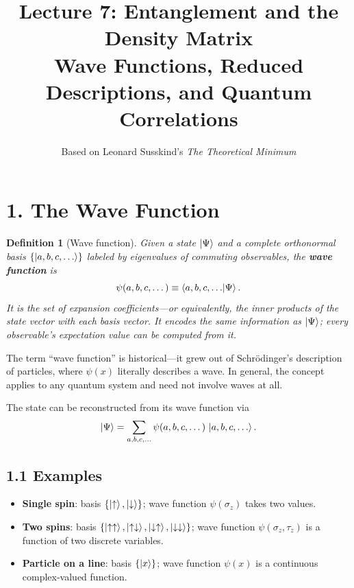 \documentclass[12pt,a4paper]{article}
\title{\textbf{Lecture 7: Entanglement and the Density Matrix} \\ \large Wave Functions, Reduced Descriptions, and Quantum Correlations}
\author{Based on Leonard Susskind's \textit{The Theoretical Minimum}}
\date{}
\newtheorem{definition}{Definition}
\begin{document}
\maketitle
\thispagestyle{fancy}

\section{1. The Wave Function}

\begin{definition}[Wave function]
Given a state $\ket{\Psi}$ and a complete orthonormal basis $\{\ket{a,b,c,\dots}\}$ labeled by eigenvalues of commuting observables, the \textbf{wave function} is
\[
    \psi(a,b,c,\dots) \equiv \braket{a,b,c,\dots}{\Psi}.
\]
It is the set of expansion coefficients---or equivalently, the inner products of the state vector with each basis vector.  It encodes the same information as $\ket{\Psi}$; every observable's expectation value can be computed from it.
\end{definition}

\noindent The term ``wave function'' is historical---it grew out of Schr\"odinger's description of particles, where $\psi(x)$ literally describes a wave.  In general, the concept applies to any quantum system and need not involve waves at all.

The state can be reconstructed from its wave function via
\[
    \ket{\Psi} = \sum_{a,b,c,\dots} \psi(a,b,c,\dots)\,\ket{a,b,c,\dots}.
\]

\subsection{1.1 Examples}
\begin{itemize}[nosep]
    \item \textbf{Single spin}: basis $\{\ket{\uparrow},\ket{\downarrow}\}$; wave function $\psi(\sigma_z)$ takes two values.
    \item \textbf{Two spins}: basis $\{\ket{\uparrow\uparrow},\ket{\uparrow\downarrow},\ket{\downarrow\uparrow},\ket{\downarrow\downarrow}\}$; wave function $\psi(\sigma_z,\tau_z)$ is a function of two discrete variables.
    \item \textbf{Particle on a line}: basis $\{\ket{x}\}$; wave function $\psi(x)$ is a continuous complex-valued function.
\end{itemize}
\end{document}
